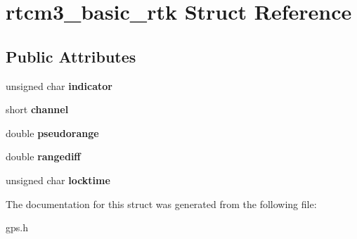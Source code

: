\hypertarget{structrtcm3__basic__rtk}{\section{rtcm3\-\_\-basic\-\_\-rtk \-Struct \-Reference}
\label{structrtcm3__basic__rtk}
}
\subsection*{\-Public \-Attributes}
\begin{DoxyCompactItemize}
\item 
\hypertarget{structrtcm3__basic__rtk_afcd6bbc8e505b903f313514679abdcce}{unsigned char {\bfseries indicator}}\label{structrtcm3__basic__rtk_afcd6bbc8e505b903f313514679abdcce}

\item 
\hypertarget{structrtcm3__basic__rtk_aaac524d6e90581e5b8c4868e50e91990}{short {\bfseries channel}}\label{structrtcm3__basic__rtk_aaac524d6e90581e5b8c4868e50e91990}

\item 
\hypertarget{structrtcm3__basic__rtk_a51086c4303f15ce283de9cdf65e6914a}{double {\bfseries pseudorange}}\label{structrtcm3__basic__rtk_a51086c4303f15ce283de9cdf65e6914a}

\item 
\hypertarget{structrtcm3__basic__rtk_a5bd67483fd0ed68ee6b26b88acb7ac7a}{double {\bfseries rangediff}}\label{structrtcm3__basic__rtk_a5bd67483fd0ed68ee6b26b88acb7ac7a}

\item 
\hypertarget{structrtcm3__basic__rtk_a540c1ed921dd047f91826b129b481989}{unsigned char {\bfseries locktime}}\label{structrtcm3__basic__rtk_a540c1ed921dd047f91826b129b481989}

\end{DoxyCompactItemize}


\-The documentation for this struct was generated from the following file\-:\begin{DoxyCompactItemize}
\item 
gps.\-h\end{DoxyCompactItemize}
